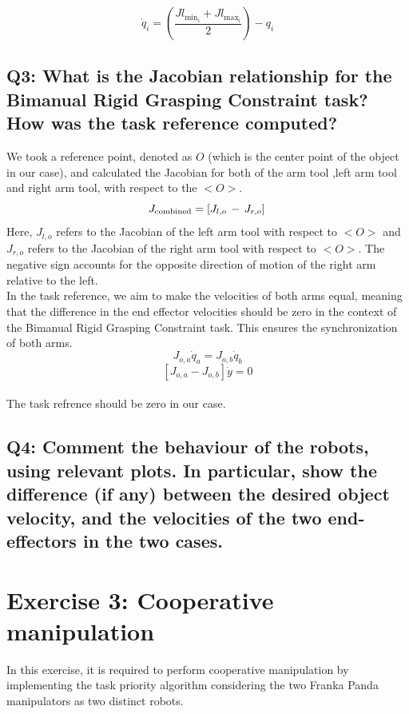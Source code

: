 \documentclass{article}
\begin{document}
\[
\dot{q}_i = \left(\frac{Jl_{\text{min}_i} + Jl_{\text{max}_i}}{2}\right) - q_i
\]

\subsection{Q3: What is the Jacobian relationship for the Bimanual Rigid Grasping Constraint task? How was the task reference computed?}

We took a reference point, denoted as  \( \mathit{O} \) (which is the center point of the object in our case), and calculated the Jacobian for both of the arm tool ,left arm tool and right arm tool, with respect to the  \( \mathit{<O>} \). \\
\[
J_{\text{combined}} = \left[ J_{l,o} \, - \, J_{r,o} \right]\\
\]
\noindent
Here, $J_{l,o}$ refers to the Jacobian of the left arm tool with respect to \( \mathit{<O>} \) and  $J_{r,o}$ refers to the Jacobian of the right arm tool with respect to \( \mathit{<O>} \). The negative sign accounts for the opposite direction of motion of the right arm relative to the left.\\
In the task reference, we aim to make the velocities of both arms equal, meaning that the difference in the end effector velocities should be zero in the context of the Bimanual Rigid Grasping Constraint task. This ensures the synchronization of both arms.\\
 
\[
{J}_{o,a} \dot{q}_a = {J}_{o,b} \dot{q}_b
\]
\[
[{J}_{o,a} - {J}_{o,b}]\dot{y}  = 0
\]\\
The task refrence should be zero in our case.
\subsection{Q4: Comment the behaviour of the robots, using relevant plots. In particular, show the difference (if any) between the desired object velocity, and the velocities of the two end-effectors in the two cases.}

\clearpage

\section{Exercise 3: Cooperative manipulation}
In this exercise, it is required to perform cooperative manipulation by implementing the task priority algorithm considering the two Franka Panda manipulators as two distinct robots. 
\end{document}
